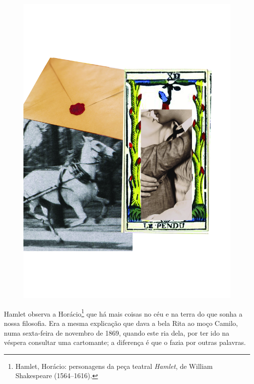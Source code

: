 \pagebreak
\thispagestyle{empty}
\begin{figure}
\vspace*{-.5cm}
\hspace*{-2.3cm}\includegraphics[width=140mm]{../ilustracoes/13_CARTOMANTE.jpg}
\end{figure}
\pagebreak


\noindent{}Hamlet observa a Horácio\footnote{Hamlet, Horácio: personagens da peça
  teatral \emph{Hamlet}, de William Shakespeare (1564--1616).} que há
mais coisas no céu e na terra do que sonha a nossa filosofia. Era a
mesma explicação que dava a bela Rita ao moço Camilo, numa sexta-feira
de novembro de 1869, quando este ria dela, por ter ido na véspera
consultar uma cartomante; a diferença é que o fazia por outras palavras.

